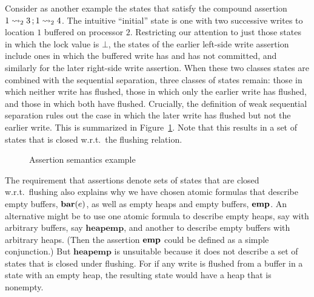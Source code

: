 \documentclass[11pt]{article}
\begin{document}
Consider as another example the states that satisfy the compound assertion $1 \leadsto_{2} 3 \operatorname{;} 1 \leadsto_{2} 4$. The intuitive ``initial'' state is one with two successive writes to location $1$ buffered on processor $2$. Restricting our attention to just those states in which the lock value is $\bot$, the states of the earlier left-side write assertion include ones in which the buffered write has and has not committed, and similarly for the later right-side write assertion. When these two classes states are combined with the sequential separation, three classes of states remain: those in which neither write has flushed, those in which only the earlier write has flushed, and those in which both have flushed. Crucially, the definition of weak sequential separation rules out the case in which the later write has flushed but not the earlier write. This is summarized in Figure~\ref{fig:leads-to-seq-example}. Note that this results in a set of states that is closed w.r.t.~the flushing relation. 
 
\begin{figure}[ht]
	\centering
	\caption{\label{fig:leads-to-seq-example}Assertion semantics example}
\end{figure}

The requirement that assertions denote sets of states that are closed w.r.t.~flushing also explains why we have chosen atomic formulas that describe empty buffers, $\mathbf{bar}(e)$, as well as empty heaps and empty buffers, $\mathbf{emp}$. An alternative might be to use one atomic formula to describe empty heaps, say with arbitrary buffers, say $\mathbf{heapemp}$, and another to describe empty buffers with arbitrary heaps. (Then the assertion $\mathbf{emp}$ could be defined as a simple conjunction.) But $\mathbf{heapemp}$ is unsuitable because it does not describe a set of states that is closed under flushing. For if any write is flushed from a buffer in a state with an empty heap, the resulting state would have a heap that is nonempty. 
\end{document}
